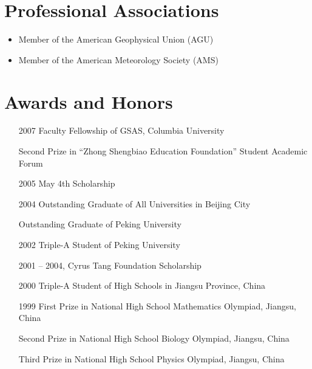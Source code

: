 \documentclass[11pt]{article}
\begin{document}
\section{Professional Associations}
\begin{itemize}[leftmargin=4ex]
	\item Member of the American Geophysical Union (AGU) 
	\item Member of the American Meteorology Society (AMS)
\end{itemize}


\section{Awards and Honors}
\begin{itemize}[leftmargin=10ex]
	\item[2007] Faculty Fellowship of GSAS, Columbia University
	
	\item[\phantom{2007}] Second Prize in ``Zhong Shengbiao Education Foundation'' Student  Academic Forum 
	
	\item[2005] May 4th Scholarship	
	
	\item[2004] Outstanding Graduate of All Universities in Beijing City
	
	\item[\phantom{2004}] Outstanding Graduate of Peking University
	
	\item[2002] Triple-A Student of Peking University
	
	\item[2001]-- 2004, Cyrus Tang Foundation Scholarship
		
	\item[2000] Triple-A Student of High Schools in Jiangsu Province,  China
	
	\item[1999] First Prize in National High School Mathematics Olympiad, Jiangsu, China

	\item[\phantom{1999}] Second Prize in National High School Biology Olympiad, Jiangsu, China

	\item[\phantom{1999}] Third Prize in National High School Physics Olympiad, Jiangsu, China
\end{itemize}
\end{document}
